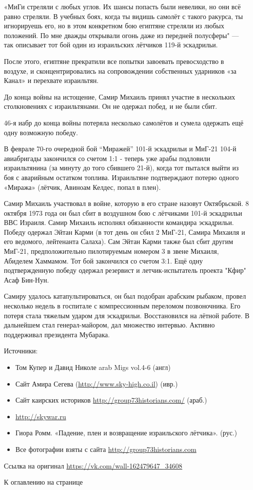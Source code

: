 «МиГи стреляли с любых углов. Их шансы попасть были невелики, но они всё равно стреляли. В учебных боях, когда ты видишь самолёт с такого ракурса, ты игнорируешь его, но в этом конкретном бою египтяне стреляли из любых положений. По мне дважды открывали огонь даже из передней полусферы" — так описывает тот бой один из израильских лётчиков 119-й эскадрильи.

После этого, египтяне прекратили все попытки завоевать превосходство в воздухе, и сконцентрировались на сопровождении собственных ударников «за Канал» и перехвате израильтян.

До конца войны на истощение, Самир Михаиль принял участие в нескольких столкновениях с израильтянами. Он не одержал побед, и не были сбит.

46-я иабр до конца войны потеряла несколько самолётов и сумела одержать ещё одну возможную победу.

В феврале 70-го очередной бой “Миражей” 101-й эскадрильи и МиГ-21 104-й авиабригады закончился со счетом 1:1 - теперь уже арабы подловили израильтянина (за минуту до того сбившего 21-й), когда тот пытался выйти из боя с аварийным остатком топлива. Израильтяне подтверждают потерю одного «Миража» (лётчик, Авиноам Келдес, попал в плен).

Самир Михаиль участвовал в войне, которую в его стране назовут Октябрьской. 8 октября 1973 года он был сбит в воздушном бою с лётчиками 101-й эскадрильи ВВС Израиля. Самир Михаиль исполнял обязанности командира эскадрильи. Победу одержал Эйтан Карми (в тот день он сбил 2 МиГ-21, Самира Михаиля и его ведомого, лейтенанта Салаха). Сам Эйтан Карми также был сбит другим МиГ-21, предположительно пилотируемым номером 3 в звене Михаиля, Абиделем Хаммамом. Тот бой закончился со счетом 3:1. Ещё одну подтвержденную победу одержал резервист и летчик-испытатель проекта "Кфир" Асаф Бин-Нун.

Самиру удалось катапультироваться, он был подобран арабским рыбаком, провел несколько недель в госпитале с компрессионным переломом позвоночника. Его потеря стала тяжелым ударом для эскадрильи. Восстановился на лётной работе. В дальнейшем стал генерал-майором, дал множество интервью. Активно поддерживал президента Мубарака. 


Источники:
\begin{itemize}
	\item Том Купер и Давид Николе arab Migs vol.4-6 (англ)   
	\item Сайт Амира Сегева (\url{http://www.sky-high.co.il}) (ивр.)

\item Сайт каирских историков \url{http://group73historians.com/} (араб.)

\item \url{http://skywar.ru}

\item Гиора Ромм. «Падение, плен и возвращение израильского лётчика». (рус.)

\item Все фотографии взяты с сайта \url{http://group73historians.com}
\end{itemize}

Ссылка на оригинал \url{https://vk.com/wall-162479647_34608}

К оглавлению на странице \pageref{tablecont}